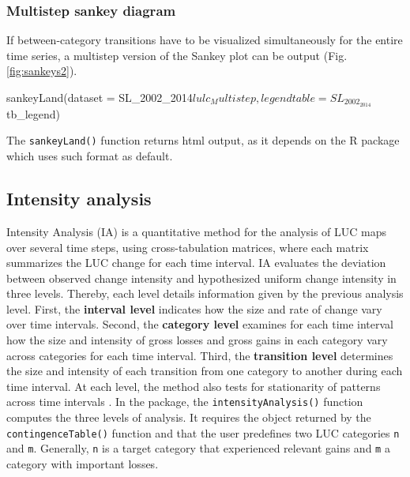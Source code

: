 \hypertarget{multistep-sankey-diagram}{%
\subsubsection{Multistep sankey diagram}\label{multistep-sankey-diagram}}

If between-category transitions have to be visualized simultaneously for
the entire time series, a multistep version of the Sankey plot can be
output (Fig. \ref{fig:sankeys2}).

\begin{Schunk}
\begin{Sinput}
sankeyLand(dataset = SL_2002_2014$lulc_Multistep,
           legendtable = SL_2002_2014$tb_legend)
\end{Sinput}
\end{Schunk}

The \texttt{sankeyLand()} function returns html output, as it depends on the  R package which uses such format as default.

\hypertarget{intensity-analysis}{%
\subsection{Intensity analysis}\label{intensity-analysis}}

Intensity Analysis (IA) is a quantitative method for the analysis of LUC
maps over several time steps, using cross-tabulation matrices, where
each matrix summarizes the LUC change for each time interval. IA
evaluates the deviation between observed change intensity and
hypothesized uniform change intensity in three levels. Thereby, each
level details information given by the previous analysis level. First,
the \textbf{interval level} indicates how the size and rate of change
vary over time intervals. Second, the \textbf{category level} examines
for each time interval how the size and intensity of gross losses and
gross gains in each category vary across categories for each time
interval. Third, the \textbf{transition level} determines the size and
intensity of each transition from one category to another during each
time interval. At each level, the method also tests for stationarity of
patterns across time intervals \citep{Aldwaik2012}. In the 
package, the \texttt{intensityAnalysis()} function computes the three
levels of analysis. It requires the object returned by the
\texttt{contingenceTable()} function and that the user predefines two
LUC categories \texttt{n} and \texttt{m}. Generally, \texttt{n} is a
target category that experienced relevant gains and \texttt{m} a
category with important losses.

